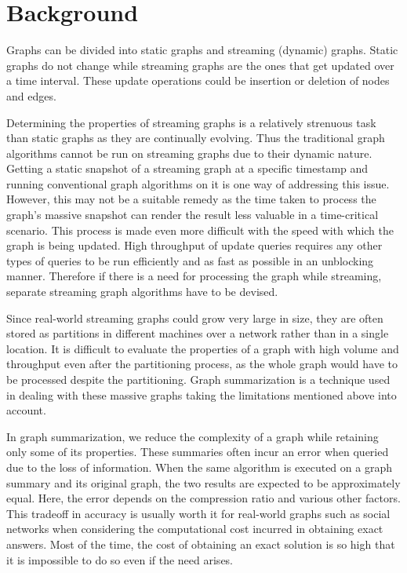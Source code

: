 \section{Background}

Graphs can be divided into static graphs and streaming (dynamic) graphs. Static graphs do not change while streaming graphs are the ones that get updated over a time interval. These update operations could be insertion or deletion of nodes and edges.

Determining the properties of streaming graphs is a relatively strenuous task than static graphs as they are continually evolving. Thus the traditional graph algorithms cannot be run on streaming graphs due to their dynamic nature. Getting a static snapshot of a streaming graph at a specific timestamp and running conventional graph algorithms on it is one way of addressing this issue. However, this may not be a suitable remedy as the time taken to process the graph’s massive snapshot can render the result less valuable in a time-critical scenario. This process is made even more difficult with the speed with which the graph is being updated. High throughput of update queries requires any other types of queries to be run efficiently and as fast as possible in an unblocking manner. Therefore if there is a need for processing the graph while streaming, separate streaming graph algorithms have to be devised\cite{mcgregor_graph_2014}. 

Since real-world streaming graphs could grow very large in size, they are often stored as partitions in different machines over a network rather than in a single location. It is difficult to evaluate the properties of a graph with high volume and throughput even after the partitioning process, as the whole graph would have to be processed despite the partitioning. Graph summarization is a technique used in dealing with these massive graphs taking the limitations mentioned above into account. 

In graph summarization, we reduce the complexity of a graph while retaining only some of its properties. These summaries often incur an error when queried due to the loss of information. When the same algorithm is executed on a graph summary and its original graph, the two results are expected to be approximately equal. Here, the error depends on the compression ratio and various other factors. This tradeoff in accuracy is usually worth it for real-world graphs such as social networks when considering the computational cost incurred in obtaining exact answers. Most of the time, the cost of obtaining an exact solution is so high that it is impossible to do so even if the need arises. 

